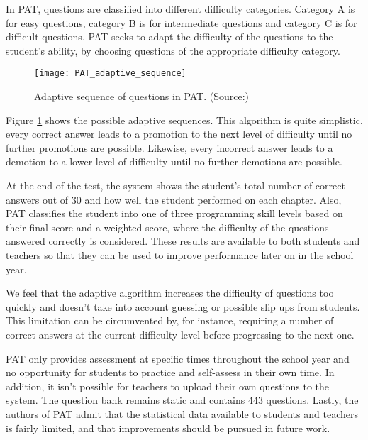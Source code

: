 In PAT, questions are classified into different difficulty categories. Category A is for easy questions, category B is for intermediate questions and category C is for difficult questions. PAT seeks to adapt the difficulty of the questions to the student's ability, by choosing questions of the appropriate difficulty category.

\begin{figure}[H]
\centering
\texttt{[image: PAT\_adaptive\_sequence]}
\caption{Adaptive sequence of questions in PAT. (Source:\cite{PAT})}
\label{fig:PAT_adaptive_sequence}
\end{figure}

Figure \ref{fig:PAT_adaptive_sequence} shows the possible adaptive sequences. This algorithm is quite simplistic, every correct answer leads to a promotion to the next level of difficulty until no further promotions are possible. Likewise, every incorrect answer leads to a demotion to a lower level of difficulty until no further demotions are possible.\newline

At the end of the test, the system shows the student's total number of correct answers out of 30 and how well the student performed on each chapter. Also, PAT classifies the student into one of three programming skill levels based on their final score and a weighted score, where the difficulty of the questions answered correctly is considered. These results are available to both students and teachers so that they can be used to improve performance later on in the school year.\newline

We feel that the adaptive algorithm increases the difficulty of questions too quickly and doesn't take into account guessing or possible slip ups from students. This limitation can be circumvented by, for instance, requiring a number of correct answers at the current difficulty level before progressing to the next one.\newline

PAT only provides assessment at specific times throughout the school year and no opportunity for students to practice and self-assess in their own time. In addition, it isn't possible for teachers to upload their own questions to the system. The question bank remains static and contains 443 questions. Lastly, the authors of PAT admit that the statistical data available to students and teachers is fairly limited, and that improvements should be pursued in future work.

